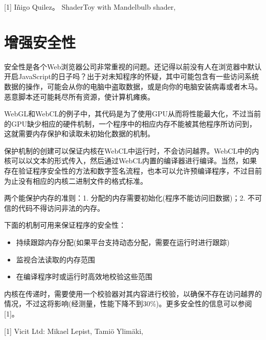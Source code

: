 \myRefRule

\begin{myRefs}

[1] Iñigo Quilez。 ShaderToy with Mandelbulb shader, 

\end{myRefs}



\section{增强安全性}

安全性是各个Web浏览器公司非常重视的问题。还记得以前没有人在浏览器中默认开启JavaScript的日子吗？出于对未知程序的怀疑，其中可能包含有一些访问系统数据的操作，可能会从你的电脑中盗取数据，或是向你的电脑安装病毒或者木马。恶意脚本还可能耗尽所有资源，使计算机瘫痪。

WebGL和WebCL的例子中，其代码是为了使用GPU从而将性能最大化，不过当前的GPU缺少相应的硬件机制，一个程序中的相应内存不能被其他程序所访问到，这就需要内存保护和读取未初始化数据的机制。

保护机制的创建可以保证内核在WebCL中运行时，不会访问越界。WebCL中的内核可以以文本的形式传入，然后通过WebCL内置的编译器进行编译。当然，如果存在验证程序安全性的方法和数字签名流程，也本可以允许预编译程序，不过目前为止没有相应的内核二进制文件的格式标准。

两个能保护内存的准则：1. 分配的内存需要初始化(程序不能访问旧数据)；2. 不可信的代码不得访问非法的内存。

下面的机制可用来保证程序的安全性：

\begin{itemize}
\item 持续跟踪内存分配(如果平台支持动态分配，需要在运行时进行跟踪)
\item 监视合法读取的内存范围
\item 在编译程序时或运行时高效地校验这些范围
\end{itemize}

内核在传递时，需要使用一个校验器对其内容进行校验，以确保不存在访问越界的情况，不过这将影响(经测量，性能下降不到30\%)。更多安全性的信息可以参阅[1]。

\myRefRule

\begin{myRefs}

[1] Vicit Ltd: Mikael Lepist, Tamiö Ylimäki, 

\end{myRefs}



